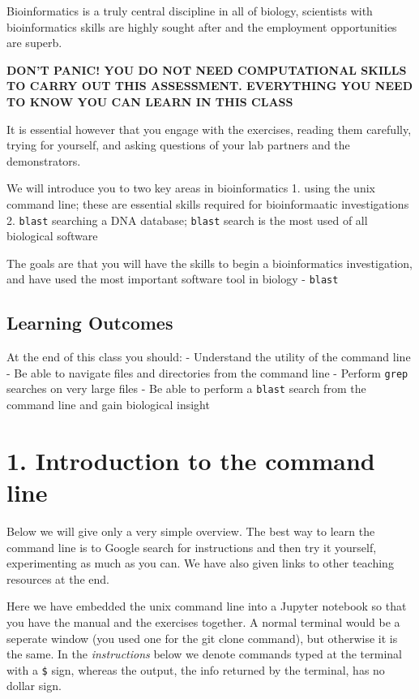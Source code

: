 \documentclass[11pt]{article}
\begin{document}
Bioinformatics is a truly central discipline in all of biology,
scientists with bioinformatics skills are highly sought after and the
employment opportunities are superb.

\textbf{DON'T PANIC! YOU DO NOT NEED COMPUTATIONAL SKILLS TO CARRY OUT
THIS ASSESSMENT. EVERYTHING YOU NEED TO KNOW YOU CAN LEARN IN THIS
CLASS}

It is essential however that you engage with the exercises, reading them
carefully, trying for yourself, and asking questions of your lab
partners and the demonstrators.

We will introduce you to two key areas in bioinformatics 1. using the
unix command line; these are essential skills required for
bioinformaatic investigations 2. \texttt{blast} searching a DNA
database; \texttt{blast} search is the most used of all biological
software

The goals are that you will have the skills to begin a bioinformatics
investigation, and have used the most important software tool in biology
- \texttt{blast}

    \hypertarget{learning-outcomes}{%
\subsection{Learning Outcomes}\label{learning-outcomes}}

At the end of this class you should: - Understand the utility of the
command line - Be able to navigate files and directories from the
command line - Perform \texttt{grep} searches on very large files - Be
able to perform a \texttt{blast} search from the command line and gain
biological insight

    \hypertarget{introduction-to-the-command-line}{%
\section{1. Introduction to the command
line}\label{introduction-to-the-command-line}}

Below we will give only a very simple overview. The best way to learn
the command line is to Google search for instructions and then try it
yourself, experimenting as much as you can. We have also given links to
other teaching resources at the end.

Here we have embedded the unix command line into a Jupyter notebook so
that you have the manual and the exercises together. A normal terminal
would be a seperate window (you used one for the git clone command), but
otherwise it is the same. In the \emph{instructions} below we denote
commands typed at the terminal with a \texttt{\$} sign, whereas the
output, the info returned by the terminal, has no dollar sign.
\end{document}
